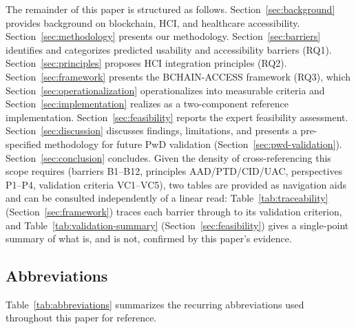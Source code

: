 \documentclass[journal,onecolumn]{IEEEtran}
\begin{document}
The remainder of this paper is structured as follows. Section~\ref{sec:background} provides background on blockchain, HCI, and healthcare accessibility. Section~\ref{sec:methodology} presents our methodology. Section~\ref{sec:barriers} identifies and categorizes predicted usability and accessibility barriers (RQ1). Section~\ref{sec:principles} proposes HCI integration principles (RQ2). Section~\ref{sec:framework} presents the BCHAIN-ACCESS framework (RQ3), which Section~\ref{sec:operationalization} operationalizes into measurable criteria and Section~\ref{sec:implementation} realizes as a two-component reference implementation. Section~\ref{sec:feasibility} reports the expert feasibility assessment. Section~\ref{sec:discussion} discusses findings, limitations, and presents a pre-specified methodology for future PwD validation (Section~\ref{sec:pwd-validation}). Section~\ref{sec:conclusion} concludes. Given the density of cross-referencing this scope requires (barriers B1--B12, principles AAD/PTD/CID/UAC, perspectives P1--P4, validation criteria VC1--VC5), two tables are provided as navigation aids and can be consulted independently of a linear read: Table~\ref{tab:traceability} (Section~\ref{sec:framework}) traces each barrier through to its validation criterion, and Table~\ref{tab:validation-summary} (Section~\ref{sec:feasibility}) gives a single-point summary of what is, and is not, confirmed by this paper's evidence.

\subsection{Abbreviations}
Table~\ref{tab:abbreviations} summarizes the recurring abbreviations used throughout this paper for reference.
\end{document}
